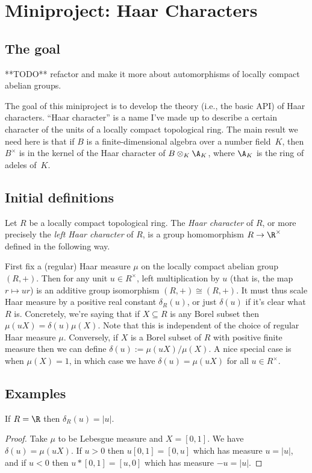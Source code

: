 \chapter{Miniproject: Haar Characters}\label{Haar_char_project}

\section{The goal}

**TODO** refactor and make it more about automorphisms of locally compact abelian groups.

The goal of this miniproject is to develop the theory (i.e., the basic API) of Haar characters.
``Haar character'' is a name I've made up to describe a certain character of the units of a locally
compact topological ring. The main result we need here is that if $B$ is a finite-dimensional
algebra over a number field~$K$, then $B^\times$ is in the kernel of the Haar character
of $B\otimes_K\A_K$, where $\A_K$ is the ring of adeles of~$K$.

\section{Initial definitions}

Let $R$ be a locally compact topological ring. The \emph{Haar character} of $R$,
or more precisely the \emph{left Haar character} of $R$, is a group homomorphism $R\to\R^\times$
defined in the following way.

First fix a (regular) Haar measure $\mu$ on the locally compact abelian group $(R,+)$. Then for any
unit $u\in R^\times$, left multiplication by $u$ (that is, the map $r\mapsto ur$) is an additive
group isomorphism $(R,+)\cong(R,+)$. It must thus scale Haar measure by a positive real
constant $\delta_R(u)$, or just $\delta(u)$ if it's clear what $R$ is. Concretely, we're saying
that if $X\subseteq R$ is any Borel subset then $\mu(uX)=\delta(u)\mu(X)$. Note that this is
independent of the choice of regular Haar measure $\mu$. Conversely, if $X$
is a Borel subset of $R$ with positive finite measure then we can define $\delta(u):=\mu(uX)/\mu(X)$.
A nice special case is when $\mu(X)=1$, in which case we have $\delta(u)=\mu(uX)$ for all
$u\in R^\times$.

\section{Examples}

\begin{lemma}
  \label{distribHaarChar_real}
  If $R=\R$ then $\delta_R(u)=|u|$.
  \leanok
\end{lemma}
\begin{proof}\leanok Take $\mu$ to be Lebesgue measure and $X=[0,1]$.
We have $\delta(u)=\mu(uX)$. If $u>0$ then $u[0,1]=[0,u]$ which has measure $u=|u|$,
and if $u<0$ then $u*[0,1]=[u,0]$ which has measure $-u=|u|$.
\end{proof}

